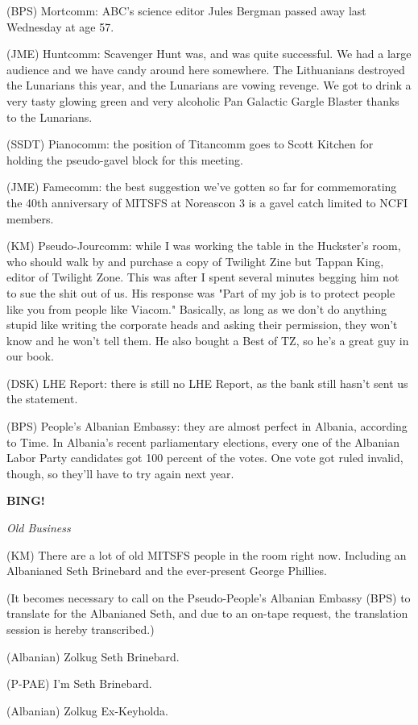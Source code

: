 \documentclass[12pt]{article}
\newcommand{\bing}{{\bf BING!} }
\newcommand{\goto}[1]{\bing \vskip 12pt \centerline{{\em{#1}}}}
\begin{document}
(BPS) Mortcomm: ABC's science editor Jules Bergman passed away last Wednesday at age 57.

(JME) Huntcomm: Scavenger Hunt was, and was quite successful. We had a large audience and we have candy around here somewhere. The Lithuanians destroyed the Lunarians this year, and the Lunarians are vowing revenge. We got to drink a very tasty glowing green and very alcoholic Pan Galactic Gargle Blaster thanks to the Lunarians.

(SSDT) Pianocomm: the position of Titancomm goes to Scott Kitchen for holding the pseudo-gavel block for this meeting.

(JME) Famecomm: the best suggestion we've gotten so far for commemorating the 40th anniversary of MITSFS at Noreascon 3 is a gavel catch limited to NCFI members.

(KM) Pseudo-Jourcomm: while I was working the table in the Huckster's room, who should walk by and purchase a copy of Twilight Zine but Tappan King, editor of Twilight Zone. This was after I spent several minutes begging him not to sue the shit out of us. His response was "Part of my job is to protect people like you from people like Viacom." Basically, as long as we don't do anything stupid like writing the corporate heads and asking their permission, they won't know and he won't tell them. He also bought a Best of TZ, so he's a great guy in our book.

(DSK) LHE Report: there is still no LHE Report, as the bank still hasn't sent us the statement.

(BPS) People's Albanian Embassy: they are almost perfect in Albania, according to Time. In Albania's recent parliamentary elections, every one of the Albanian Labor Party candidates got 100 percent of the votes. One vote got ruled invalid, though, so they'll have to try again next year.

\goto{Old Business}

(KM) There are a lot of old MITSFS people in the room right now. Including an Albanianed Seth Brinebard and the ever-present George Phillies.

(It becomes necessary to call on the Pseudo-People's Albanian Embassy (BPS) to translate for the Albanianed Seth, and due to an on-tape request, the translation session is hereby transcribed.)

(Albanian) Zolkug Seth Brinebard.

(P-PAE) I'm Seth Brinebard.

(Albanian) Zolkug Ex-Keyholda.
\end{document}
